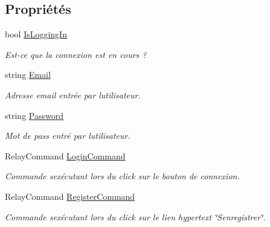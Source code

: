 \subsection*{Propriétés}
\begin{DoxyCompactItemize}
\item 
bool \hyperlink{class_boxes_1_1_view_models_1_1_login_view_model_a63c41a62b46524d72f7b787df892588c}{Is\+Logging\+In}
\begin{DoxyCompactList}\small\item\em Est-\/ce que la connexion est en cours ? \end{DoxyCompactList}\item 
string \hyperlink{class_boxes_1_1_view_models_1_1_login_view_model_adba04d5e03c3760ba5558ede7be4cc7b}{Email}
\begin{DoxyCompactList}\small\item\em Adresse email entrée par l\textquotesingle{}utilisateur. \end{DoxyCompactList}\item 
string \hyperlink{class_boxes_1_1_view_models_1_1_login_view_model_afe04bca22ce0658d9425ddbfda938132}{Password}
\begin{DoxyCompactList}\small\item\em Mot de pass entré par l\textquotesingle{}utilisateur. \end{DoxyCompactList}\item 
Relay\+Command \hyperlink{class_boxes_1_1_view_models_1_1_login_view_model_a6f00ee2692c6c1309e8333618495f392}{Login\+Command}
\begin{DoxyCompactList}\small\item\em Commande s\textquotesingle{}exécutant lors du click sur le bouton de connexion. \end{DoxyCompactList}\item 
Relay\+Command \hyperlink{class_boxes_1_1_view_models_1_1_login_view_model_ac9703766c99fbb8a8ecfbac2a2e0dd06}{Register\+Command}
\begin{DoxyCompactList}\small\item\em Commande s\textquotesingle{}exécutant lors du click sur le lien hypertext \char`\"{}\+S\textquotesingle{}enregistrer\char`\"{}. \end{DoxyCompactList}\end{DoxyCompactItemize}
